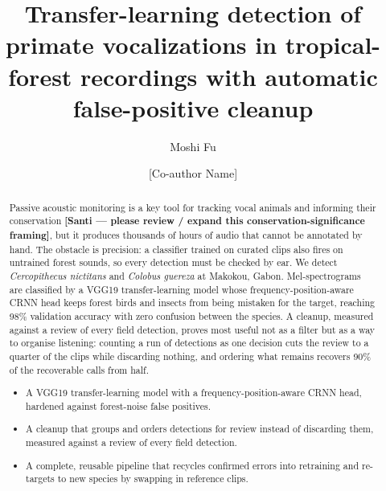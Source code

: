 \documentclass[final,3p,times]{elsarticle}
\begin{document}
\begin{frontmatter}

\title{Transfer-learning detection of primate vocalizations in
tropical-forest recordings with automatic false-positive cleanup}

\author[a]{Moshi Fu}

\author[a]{[Co-author Name]}



\begin{abstract}
Passive acoustic monitoring is a key tool for tracking vocal animals and
informing their conservation \textbf{[Santi --- please review / expand this
conservation-significance framing]}, but it produces thousands of hours of
audio that cannot be annotated by hand. The obstacle is precision: a classifier
trained on curated clips also fires on untrained forest sounds, so every
detection must be checked by ear. We detect \textit{Cercopithecus nictitans}
and \textit{Colobus guereza} at Makokou, Gabon. Mel-spectrograms are classified
by a VGG19 transfer-learning model whose frequency-position-aware CRNN head
keeps forest birds and insects from being mistaken for the target, reaching
98\% validation accuracy with zero confusion between the species. A cleanup,
measured against a review of every field detection, proves most useful not as a
filter but as a way to organise listening: counting a run of detections as one
decision cuts the review to a quarter of the clips while discarding nothing,
and ordering what remains recovers 90\% of the recoverable calls from half.

\begin{itemize}
\item A VGG19 transfer-learning model with a frequency-position-aware CRNN
head, hardened against forest-noise false positives.
\item A cleanup that groups and orders detections for review instead of
discarding them, measured against a review of every field detection.
\item A complete, reusable pipeline that recycles confirmed errors into
retraining and re-targets to new species by swapping in reference clips.
\end{itemize}
\end{abstract}


\end{frontmatter}
\end{document}
